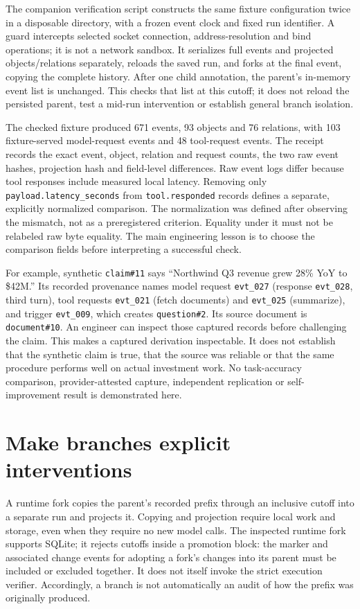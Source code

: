 \documentclass[11pt]{article}
\begin{document}
The companion verification script constructs the same fixture configuration twice in a disposable directory, with a frozen event clock and fixed run identifier. A guard intercepts selected socket connection, address-resolution and bind operations; it is not a network sandbox. It serializes full events and projected objects/relations separately, reloads the saved run, and forks at the final event, copying the complete history. After one child annotation, the parent's in-memory event list is unchanged. This checks that list at this cutoff; it does not reload the persisted parent, test a mid-run intervention or establish general branch isolation.

The checked fixture produced 671 events, 93 objects and 76 relations, with 103 fixture-served model-request events and 48 tool-request events. The receipt records the exact event, object, relation and request counts, the two raw event hashes, projection hash and field-level differences. Raw event logs differ because tool responses include measured local latency. Removing only \texttt{payload.latency\_seconds} from \texttt{tool.responded} records defines a separate, explicitly normalized comparison. The normalization was defined after observing the mismatch, not as a preregistered criterion. Equality under it must not be relabeled raw byte equality. The main engineering lesson is to choose the comparison fields before interpreting a successful check.

For example, synthetic \texttt{claim\#11} says ``Northwind Q3 revenue grew 28\% YoY to \$42M.'' Its recorded provenance names model request \texttt{evt\_027} (response \texttt{evt\_028}, third turn), tool requests \texttt{evt\_021} (fetch documents) and \texttt{evt\_025} (summarize), and trigger \texttt{evt\_009}, which creates \texttt{question\#2}. Its source document is \texttt{document\#10}. An engineer can inspect those captured records before challenging the claim. This makes a captured derivation inspectable. It does not establish that the synthetic claim is true, that the source was reliable or that the same procedure performs well on actual investment work. No task-accuracy comparison, provider-attested capture, independent replication or self-improvement result is demonstrated here.

\section*{Make branches explicit interventions}
A runtime fork copies the parent's recorded prefix through an inclusive cutoff into a separate run and projects it. Copying and projection require local work and storage, even when they require no new model calls. The inspected runtime fork supports SQLite; it rejects cutoffs inside a promotion block: the marker and associated change events for adopting a fork's changes into its parent must be included or excluded together. It does not itself invoke the strict execution verifier. Accordingly, a branch is not automatically an audit of how the prefix was originally produced.
\end{document}
